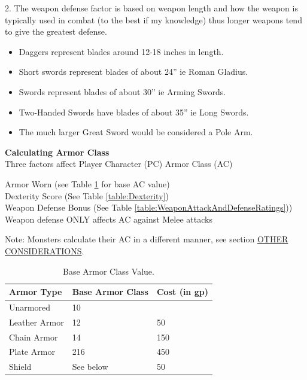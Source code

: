 \documentclass[letterpaper,sansserif,tightsqueeze]{rpg-module}
\begin{document}
2. The weapon defense factor is based on weapon length and how the weapon is typically used in combat (to the best if my knowledge) thus longer weapons tend to give the greatest defense.
\begin{itemize}
	\item Daggers represent blades around 12-18 inches in length.
	\item Short swords represent blades of about 24” ie Roman Gladius.
	\item Swords represent blades of about 30” ie Arming Swords.
	\item Two-Handed Swords have blades of about 35” ie Long Swords.
	\item The much larger Great Sword would be considered a Pole Arm.
\end{itemize}

\textbf{Calculating Armor Class}\\
Three factors affect Player Character (PC) Armor Class (AC)

Armor Worn (see Table \ref{table:BaseArmorClassValue} for base AC value)\\
Dexterity Score (See Table \ref{table:Dexterity})\\
Weapon Defense Bonus (See Table \ref{table:WeaponAttackAndDefenseRatings}))\\
Weapon defense ONLY affects AC against Melee attacks

Note: Monsters calculate their AC in a different manner, see section \hyperref[subsection:MonsterAC]{OTHER CONSIDERATIONS}.

\begin{table}[h!]
	\centering
	\begin{tabular}{|l|l|l|}
		\hline
		\textbf{Armor Type}    & \textbf{Base Armor Class} & \textbf{Cost (in gp)} \\ \hline
		Unarmored     & 10               &              \\ \hline
		Leather Armor & 12               & 50           \\ \hline
		Chain Armor   & 14               & 150          \\ \hline
		Plate Armor   & 216              & 450          \\ \hline
		Shield        & See below        & 50           \\ \hline
	\end{tabular}
	\caption{Base Armor Class Value.}
	\label{table:BaseArmorClassValue}
\end{table}
\end{document}
